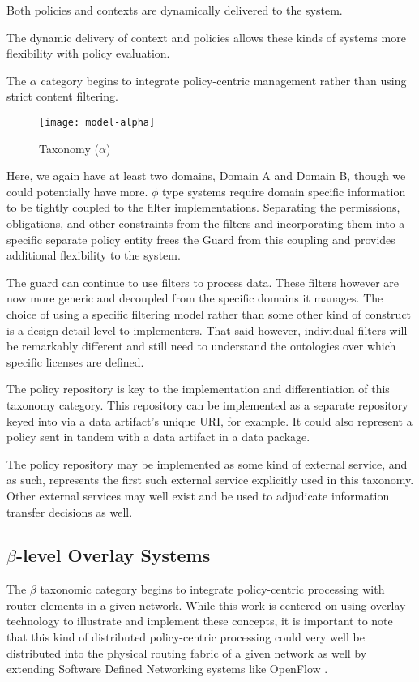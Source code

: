 Both policies and contexts are dynamically delivered to the system.

The dynamic delivery of context and policies allows these kinds of systems more flexibility with policy evaluation.

The $\alpha$ category begins to integrate policy-centric management rather than using strict content filtering.

\begin{figure}[!t]
\centering
\texttt{[image: model-alpha]}
\caption{Taxonomy ($\alpha$)}
\label{fig:model:taxonomy-alpha}
\end{figure}

Here, we again have at least two domains, Domain A and Domain B, though we could potentially have more.  $\phi$ type systems require domain specific information to be tightly coupled to the filter implementations.  Separating the permissions, obligations, and other constraints from the filters and incorporating them into a specific separate policy entity frees the Guard from this coupling and provides additional flexibility to the system.

The guard can continue to use filters to process data.  These filters however are now more generic and decoupled from the specific domains it manages.  The choice of using a specific filtering model rather than some other kind of construct is a design detail level to implementers.  That said however, individual filters will be remarkably different and still need to understand the ontologies over which specific licenses are defined.

The policy repository is key to the implementation and differentiation of this taxonomy category.  This repository can be implemented as a separate repository keyed into via a data artifact's unique URI, for example.  It could also represent a policy sent in tandem with a data artifact in a data package.

The policy repository may be implemented as some kind of external service, and as such, represents the first such external service explicitly used in this taxonomy.  Other external services may well exist and be used to adjudicate information transfer decisions as well.

\subsection{$\beta$-level Overlay Systems}
The $\beta$ taxonomic category begins to integrate policy-centric processing with router elements in a given network.  While this work is centered on using overlay technology to illustrate and implement these concepts, it is important to note that this kind of distributed policy-centric processing could very well be distributed into the physical routing fabric of a given network as well by extending Software Defined Networking systems like OpenFlow \cite{proposal:openflow}.

